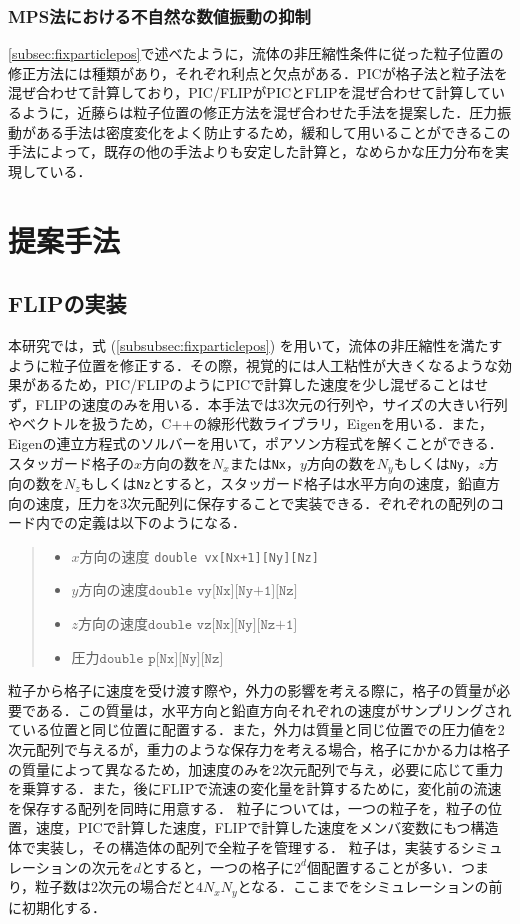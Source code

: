 \documentclass[a4j,12pt]{jreport}
\begin{document}
\subsection{MPS法における不自然な数値振動の抑制}\label{subsec:japan}
\ref{subsec:fixparticlepos}で述べたように，流体の非圧縮性条件に従った粒子位置の修正方法には種類があり，それぞれ利点と欠点がある．PICが格子法と粒子法を混ぜ合わせて計算しており，PIC/FLIPがPICとFLIPを混ぜ合わせて計算しているように，近藤らは粒子位置の修正方法を混ぜ合わせた手法\cite{kondou}を提案した．圧力振動がある手法は密度変化をよく防止するため，緩和して用いることができるこの手法によって，既存の他の手法よりも安定した計算と，なめらかな圧力分布を実現している．

\chapter{提案手法} \label{chapter:4}
\section{FLIPの実装} \label{sec:ImpFLIP}
本研究では，式 (\ref{subsubsec:fixparticlepos}) を用いて，流体の非圧縮性を満たすように粒子位置を修正する．その際，視覚的には人工粘性が大きくなるような効果があるため，PIC/FLIPのようにPICで計算した速度を少し混ぜることはせず，FLIPの速度のみを用いる．本手法では3次元の行列や，サイズの大きい行列やベクトルを扱うため，C++の線形代数ライブラリ，Eigenを用いる．また，Eigenの連立方程式のソルバーを用いて，ポアソン方程式を解くことができる．
スタッガード格子の$x$方向の数を$N_x$または\texttt{Nx}，$y$方向の数を$N_y$もしくは\texttt{Ny}，$z$方向の数を$N_z$もしくは\texttt{Nz}とすると，スタッガード格子は水平方向の速度，鉛直方向の速度，圧力を3次元配列に保存することで実装できる．ぞれぞれの配列のコード内での定義は以下のようになる．
\begin{quote}
	\begin{itemize}
		\item $x$方向の速度 \texttt{double vx[Nx+1][Ny][Nz]} 
		\item $y方向の速度 \texttt{double vy[Nx][Ny+1][Nz]}$ 
		\item $z方向の速度 \texttt{double vz[Nx][Ny][Nz+1]}$ 
		\item $圧力 \texttt{double p[Nx][Ny][Nz]}$
	\end{itemize}
\end{quote}
粒子から格子に速度を受け渡す際や，外力の影響を考える際に，格子の質量が必要である．この質量は，水平方向と鉛直方向それぞれの速度がサンプリングされている位置と同じ位置に配置する．また，外力は質量と同じ位置での圧力値を2次元配列で与えるが，重力のような保存力を考える場合，格子にかかる力は格子の質量によって異なるため，加速度のみを2次元配列で与え，必要に応じて重力を乗算する．また，後にFLIPで流速の変化量を計算するために，変化前の流速を保存する配列を同時に用意する．
粒子については，一つの粒子を，粒子の位置，速度，PICで計算した速度，FLIPで計算した速度をメンバ変数にもつ構造体で実装し，その構造体の配列で全粒子を管理する．
粒子は，実装するシミュレーションの次元を$d$とすると，一つの格子に$2^d$個配置することが多い．つまり，粒子数は2次元の場合だと$4N_xN_y$となる．ここまでをシミュレーションの前に初期化する．
\end{document}
